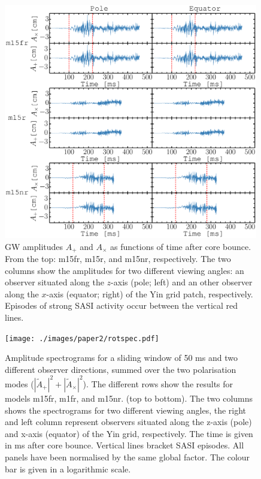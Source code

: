 \begin{figure}           
\centering                            
\includegraphics[width=0.99\textwidth]{./images/paper2/amps.pdf}
\caption{GW amplitudes $A_+$ and $A_\times$ as functions of time after core bounce.
  From the top: m15fr, m15r, and m15nr, respectively. 
  The two columns show the amplitudes for two different viewing angles: an observer
  situated along the $z$-axis (pole; left) and an other observer along the $x$-axis (equator; right) of the Yin grid patch, respectively.
  Episodes of strong SASI activity occur between the vertical red lines.  \label{figp2:amps}}
\end{figure}
\begin{figure}
\centering                            
\texttt{[image: ./images/paper2/rotspec.pdf]}
\caption{Amplitude spectrograms for a sliding window of 50 ms and two different observer
  directions, summed over the two polarisation modes 
  ($|\widetilde{A}_+|^2 + |\widetilde{A}_\times|^2$). The
  different rows show the results for models m15fr, m1fr, and m15nr. (top to bottom).
  The two columns shows the spectrograms for two different viewing angles, the right and left column represent
  observers situated along the z-axis (pole) and x-axis (equator) of the Yin grid, respectively.
  The time is given in ms after core bounce. Vertical lines bracket SASI episodes. All panels have been normalised by the same global factor.
  The colour bar is given in a logarithmic scale. \label{figp2:spec}}
\end{figure}


